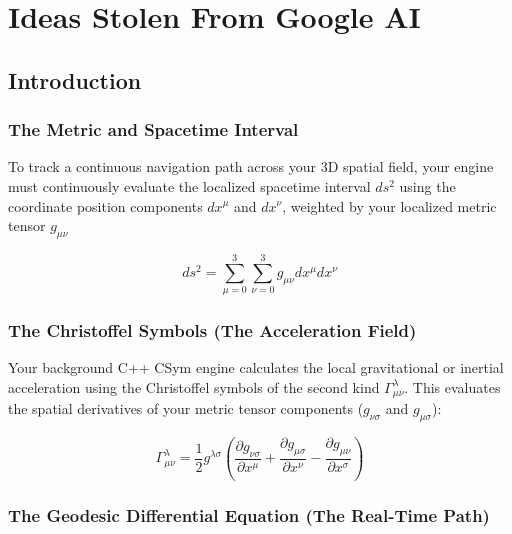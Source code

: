  

\chapter[GoogleAIMode]{Ideas Stolen From Google AI}

\section{Introduction}



\subsection{The Metric and Spacetime Interval}

To track a continuous navigation path across your 3D spatial field, your engine must continuously evaluate the localized spacetime interval \(ds^{2}\) using the coordinate position components \(dx^{\mu }\) and \(dx^{\nu }\), weighted by your localized metric tensor \(g_{\mu \nu }\)

\[
ds^2 = \sum_{\mu=0}^{3} \sum_{\nu=0}^{3} g_{\mu\nu} dx^\mu dx^\nu
\]


\subsection{The Christoffel Symbols (The Acceleration Field)}

Your background C++ CSym engine calculates the local gravitational or inertial acceleration using the Christoffel symbols of the second kind \(\Gamma _{\mu \nu }^{\lambda }\). This evaluates the spatial derivatives of your metric tensor components (\(g_{\nu \sigma }\) and \(g_{\mu \sigma }\)):

\[
\Gamma^\lambda_{\mu\nu} = \frac{1}{2} g^{\lambda\sigma} \left( \frac{\partial g_{\nu\sigma}}{\partial x^\mu} + \frac{\partial g_{\mu\sigma}}{\partial x^\nu} - \frac{\partial g_{\mu\nu}}{\partial x^\sigma} \right)
\]


\subsection{The Geodesic Differential Equation (The Real-Time Path)}

